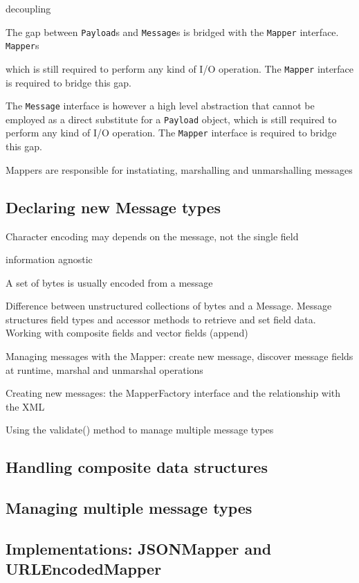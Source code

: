 decoupling

The gap between \texttt{Payload}s and \texttt{Message}s is bridged with the
\texttt{Mapper} interface. \texttt{Mapper}s 


which is still
required to perform any kind of I/O operation. The \texttt{Mapper} interface is required to bridge this
gap.

The \texttt{Message} interface is however a high level abstraction that cannot
be employed as a direct substitute for a \texttt{Payload} object, which is still
required to perform any kind of I/O operation. The \texttt{Mapper} interface is required to bridge this
gap.

Mappers are responsible for instatiating, marshalling and unmarshalling
messages

\subsection{Declaring new Message types}


Character encoding may depends on the message, not the single field

information agnostic

A set of bytes is usually encoded from a message

Difference between unstructured collections of bytes and a Message.
Message structures field types and accessor methods to retrieve and set field
data. Working with composite fields and vector fields (append)

Managing messages with the Mapper: create new message, discover message
fields at runtime, marshal and unmarshal operations

Creating new messages: the MapperFactory interface and the relationship with
the XML


Using the validate() method to manage multiple message types



\subsection{Handling composite data structures}

\subsection{Managing multiple message types}

\subsection{Implementations: JSONMapper and URLEncodedMapper}


